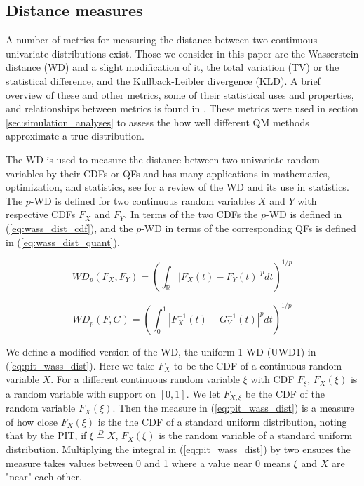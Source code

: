 \documentclass[preprint,12pt,authoryear]{elsarticle}
\begin{document}
\subsection{Distance measures}

A number of metrics for measuring the distance between two continuous univariate distributions exist. Those we consider in this paper are the Wasserstein distance (WD) and a slight modification of it, the total variation (TV) or the statistical difference, and the Kullback-Leibler divergence (KLD). A brief overview of these and other metrics, some of their statistical uses and properties, and relationships between metrics is found in \cite{gibbs2002choosing}. These metrics were used in section \ref{sec:simulation_analyses} to assess the how well different QM methods approximate a true distribution.


The WD is used to measure the distance between two univariate random variables by their CDFs or QFs and has many applications in mathematics, optimization, and statistics, see \cite{panaretos2019statistical} for a review of the WD and its use in statistics. The $p$-WD is defined for two continuous random variables $X$ and $Y$ with respective CDFs $F_X$ and $F_Y$. In terms of the two CDFs the $p$-WD is defined in (\ref{eq:wass_dist_cdf}), and the $p$-WD in terms of the corresponding QFs is defined in (\ref{eq:wass_dist_quant}). 

\begin{equation}
    \label{eq:wass_dist_cdf}
    WD_p (F_X, F_Y) = \left( \int_{\mathbb{R}} |F_X(t) - F_Y(t)|^p dt\right)^{1/p}
\end{equation}

\begin{equation}
    \label{eq:wass_dist_quant}
    WD_p (F, G) = \left( \int_0^1 |F^{-1}_X(t) - G^{-1}_Y(t)|^p dt \right)^{1/p}
\end{equation}

We define a modified version of the WD, the uniform 1-WD (UWD1) in (\ref{eq:pit_wass_dist}). Here we take $F_X$ to be the CDF of a continuous random variable $X$. For a different continuous random variable $\xi$ with CDF $F_{\xi}$, $F_X(\xi)$ is a random variable with support on $[0,1]$. We let $F_{X,\xi}$ be the CDF of the random variable $F_X(\xi)$. Then the measure in (\ref{eq:pit_wass_dist}) is a measure of how close $F_X(\xi)$ is the the CDF of a standard uniform distribution, noting that by the PIT, if $\xi \overset{D}{=} X$, $F_X(\xi)$ is the random variable of a standard uniform distribution. Multiplying the integral in (\ref{eq:pit_wass_dist}) by two ensures the measure takes values between 0 and 1 \cite[]{645854} where a value near 0 means $\xi$ and $X$ are "near" each other.
\end{document}
